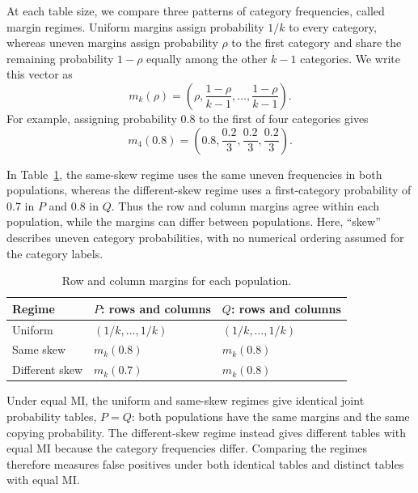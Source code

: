 At each table size, we compare three patterns of category frequencies,
called margin regimes. Uniform margins assign probability \(1/k\) to
every category, whereas uneven margins assign probability \(\rho\) to
the first category and share the remaining probability \(1-\rho\) equally
among the other \(k-1\) categories. We write this vector as
\begin{equation}
 m_k(\rho)=\left(\rho,\frac{1-\rho}{k-1},\ldots,
                   \frac{1-\rho}{k-1}\right).
 \label{eq:skew-margin}
\end{equation}
For example, assigning probability 0.8 to the first of four categories gives
\begin{equation*}
 m_4(0.8)=\left(0.8,\frac{0.2}{3},\frac{0.2}{3},\frac{0.2}{3}\right).
\end{equation*}

In Table~\ref{tab:margin-profiles}, the same-skew regime uses the same
uneven frequencies in both populations, whereas the different-skew regime
uses a first-category probability of 0.7 in \(P\) and 0.8 in \(Q\).
Thus the row and column margins agree within each population, while the
margins can differ between populations.
Here, ``skew'' describes uneven category probabilities, with no numerical
ordering assumed for the category labels.

\begin{table}[htbp]
\centering
\caption{Row and column margins for each population.}
\label{tab:margin-profiles}
\thesistableformat
\begin{tabular}{@{}lll@{}}
\toprule
\textbf{Regime} & \(P\): \textbf{rows and columns} & \(Q\): \textbf{rows and columns}\\
\midrule
Uniform & \((1/k,\ldots,1/k)\) & \((1/k,\ldots,1/k)\)\\
\addlinespace[0.3em]
Same skew & \(m_k(0.8)\) & \(m_k(0.8)\)\\
\addlinespace[0.3em]
Different skew & \(m_k(0.7)\) & \(m_k(0.8)\)\\
\bottomrule
\end{tabular}
\end{table}

Under equal MI, the uniform and same-skew regimes give identical joint
probability tables, \(P=Q\): both populations have the same margins and
the same copying probability. The different-skew regime instead gives
different tables with equal MI because the category frequencies differ.
Comparing the regimes therefore measures false positives under both
identical tables and distinct tables with equal MI.

